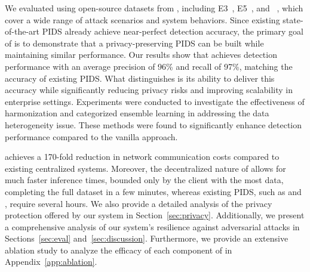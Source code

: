 We evaluated \Sys using open-source datasets from \darpa, including E3~\cite{error3}, E5~\cite{bug5}, and \optc~\cite{anjum2021analyzing}, which cover a wide range of attack scenarios and system behaviors. Since existing state-of-the-art PIDS already achieve near-perfect detection accuracy, the primary goal of \Sys is to demonstrate that a privacy-preserving PIDS can be built while maintaining similar performance. Our results show that \Sys achieves detection performance with an average precision of 96\% and recall of 97\%, matching the accuracy of existing PIDS. What distinguishes \Sys is its ability to deliver this accuracy while significantly reducing privacy risks and improving scalability in enterprise settings. Experiments were conducted to investigate the effectiveness of \wordvec harmonization and categorized ensemble learning in addressing the data heterogeneity issue. These methods were found to significantly enhance detection performance compared to the vanilla approach.

\Sys achieves a 170-fold reduction in network communication costs compared to existing centralized systems. Moreover, the decentralized nature of \Sys allows for much faster inference times, bounded only by the client with the most data, completing the full \optc dataset in a few minutes, whereas existing PIDS, such as \flash and \kairos, require several hours. We also provide a detailed analysis of the privacy protection offered by our system in Section~\ref{sec:privacy}. Additionally, we present a comprehensive analysis of our system's resilience against adversarial attacks in Sections~\ref{sec:eval} and~\ref{sec:discussion}. Furthermore, we provide an extensive ablation study to analyze the efficacy of each component of \Sys in Appendix~\ref{app:ablation}.



